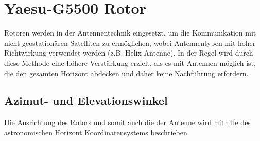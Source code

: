 \chapter{Yaesu-G5500 Rotor}
Rotoren werden in der Antennentechnik eingesetzt, um die Kommunikation mit nicht-geostationären Satelliten zu ermöglichen, wobei Antennentypen mit hoher Richtwirkung verwendet werden (z.B. Helix-Antenne). In der Regel wird durch diese Methode eine höhere Verstärkung erzielt, als es mit Antennen möglich ist, die den gesamten Horizont abdecken und daher keine Nachführung erfordern. 
\section{Azimut- und Elevationswinkel}
Die Ausrichtung des Rotors und somit auch die der Antenne wird mithilfe des astronomischen Horizont Koordinatensystems beschrieben. 